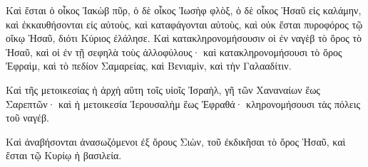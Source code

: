 {Καὶ ἔσται ὁ οἶκος Ἰακὼβ πῦρ, ὁ δὲ οἶκος Ἰωσὴφ φλὸξ, ὁ δὲ οἶκος Ἡσαῦ εἰς καλάμην, καὶ ἐκκαυθήσονται εἰς αὐτοὺς, καὶ καταφάγονται αὐτοὺς, καὶ οὐκ ἔσται πυροφόρος τῷ οἴκῳ Ἡσαῦ, διότι Κύριος ἐλάλησε.
Καὶ κατακληρονομήσουσιν οἱ ἐν ναγὲβ τὸ ὄρος τὸ Ἡσαῦ, καὶ οἱ ἐν τῇ σεφηλὰ τοὺς ἀλλοφύλους· καὶ κατακληρονομήσουσι τὸ ὄρος Ἐφραὶμ, καὶ τὸ πεδίον Σαμαρείας, καὶ Βενιαμὶν, καὶ τὴν Γαλααδίτιν.
\par }{\PP {}Καὶ τῆς μετοικεσίας ἡ ἀρχὴ αὕτη τοῖς υἱοῖς Ἰσραὴλ, γῆ τῶν Χαναναίων ἕως Σαρεπτῶν· καὶ ἡ μετοικεσία Ἱερουσαλὴμ ἕως Ἐφραθά· κληρονομήσουσι τὰς πόλεις τοῦ ναγέβ.
\par }{\PP {}Καὶ ἀναβήσονται ἀνασωζόμενοι ἐξ ὄρους Σιὼν, τοῦ ἐκδικῆσαι τὸ ὄρος Ἡσαῦ, καὶ ἔσται τῷ Κυρίῳ ἡ βασιλεία.
\par }